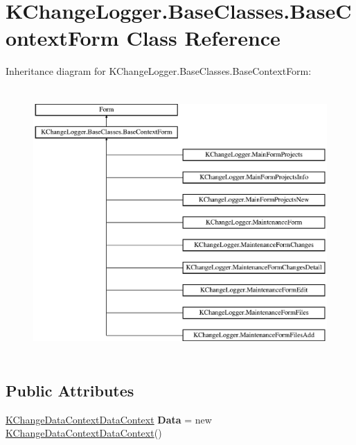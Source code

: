 \hypertarget{class_k_change_logger_1_1_base_classes_1_1_base_context_form}{\section{K\-Change\-Logger.\-Base\-Classes.\-Base\-Context\-Form Class Reference}
\label{class_k_change_logger_1_1_base_classes_1_1_base_context_form}
}
Inheritance diagram for K\-Change\-Logger.\-Base\-Classes.\-Base\-Context\-Form\-:\begin{figure}[H]
\begin{center}
\leavevmode
\includegraphics[height=10.266666cm]{class_k_change_logger_1_1_base_classes_1_1_base_context_form}
\end{center}
\end{figure}
\subsection*{Public Attributes}
\begin{DoxyCompactItemize}
\item 
\hypertarget{class_k_change_logger_1_1_base_classes_1_1_base_context_form_adc07cde18ebe56c2945bcdbbeb2051b6}{\hyperlink{class_k_change_logger_1_1_k_change_data_context_data_context}{K\-Change\-Data\-Context\-Data\-Context} {\bfseries Data} = new \hyperlink{class_k_change_logger_1_1_k_change_data_context_data_context}{K\-Change\-Data\-Context\-Data\-Context}()}\label{class_k_change_logger_1_1_base_classes_1_1_base_context_form_adc07cde18ebe56c2945bcdbbeb2051b6}

\end{DoxyCompactItemize}
